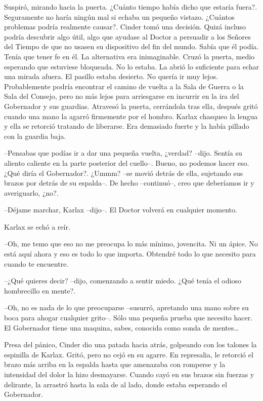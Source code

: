 Suspiró, mirando hacia la puerta. ¿Cuánto tiempo había dicho que estaría fuera?. Seguramente no haría ningún mal si echaba un pequeño vistazo. ¿Cuántos problemas podría realmente causar?. 
Cinder tomó una decisión. Quizá incluso podría descubrir algo útil, algo que ayudase al Doctor a persuadir a los Señores del Tiempo de que no usasen su dispositivo del fin del mundo. Sabía que él podía. Tenía que tener fe en él. La alternativa era inimaginable. 
Cruzó la puerta, medio esperando que estuviese bloqueada. No lo estaba. La abrió lo suficiente para echar una mirada afuera. El pasillo estaba desierto. No quería ir muy lejos. Probablemente podría encontrar el camino de vuelta a la Sala de Guerra o la Sala del Consejo, pero no más lejos para arriesgarse en incurrir en la ira del Gobernador y sus guardias. Atravesó la puerta, cerrándola tras ella, después gritó cuando una mano la agarró firmemente por el hombro. Karlax chasqueo la lengua y ella se retorció tratando de liberarse. Era demasiado fuerte y la había pillado con la guardia baja. 

--Pensabas que podías ir a dar una pequeña vuelta, ¿verdad? --dijo. Sentía su aliento caliente en la parte posterior del cuello--. Bueno, no podemos hacer eso. ¿Qué diría el Gobernador?. ¿Ummm? --se movió detrás de ella, sujetando sus brazos por detrás de su espalda--. De hecho --continuó--, creo que deberíamos ir y averiguarlo, ¿no?.
 
--Déjame marchar, Karlax --dijo--. El Doctor volverá en cualquier momento. 

Karlax se echó a reír. 

--Oh, me temo que eso no me preocupa lo más mínimo, jovencita. Ni un ápice. No está aquí ahora y eso es todo lo que importa. Obtendré todo lo que necesito para cuando te encuentre. 

--¿Qué quieres decir? --dijo, comenzando a sentir miedo. ¿Qué tenía el odioso hombrecillo en mente?.
 
--Oh, no es nada de lo que preocuparse --susurró, apretando una mano sobre su boca para ahogar cualquier grito--. Sólo una pequeña prueba que necesito hacer. El Gobernador tiene una maquina, sabes, conocida como sonda de mentes… 

Presa del pánico, Cinder dio una patada hacia atrás, golpeando con los talones la espinilla de Karlax. Gritó, pero no cejó en su agarre. En represalia, le retorció el brazo más arriba en la espalda hasta que amenazaba con romperse y la intensidad del dolor la hizo desmayarse. Cuando cayó en sus brazos sin fuerzas y delirante, la arrastró hasta la sala de al lado, donde estaba esperando el Gobernador. 

